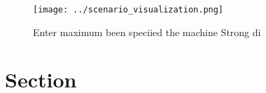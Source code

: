 \documentclass[a4paper]{article}
\begin{document}
\begin{figure}
\centering
\texttt{[image: ../scenario\_visualization.png]}
\caption{Enter maximum been speciied the machine Strong di
}
\end{figure}
 
\section{Section}
\end{document}
